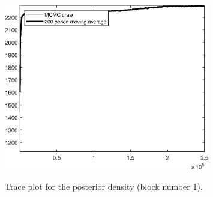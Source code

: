 \begin{figure}[H]
\centering
  \includegraphics[width=0.8\textwidth]{BRS_est_shopping/graphs/TracePlot_Posterior_blck_1}\\
    \caption{Trace plot for the posterior density (block number 1).}
\end{figure}
